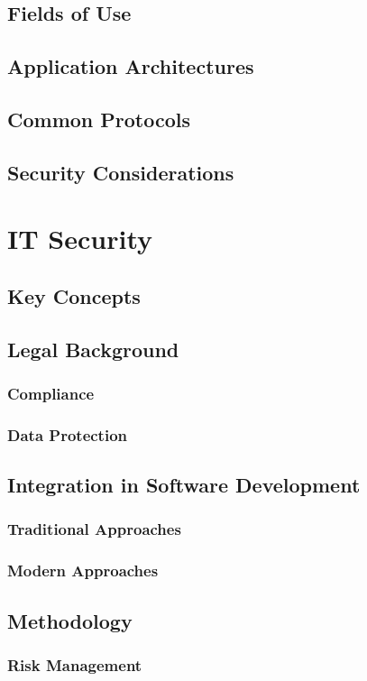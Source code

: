 \subsection{Fields of Use}
\subsection{Application Architectures}
\subsection{Common Protocols}
\subsection{Security Considerations}

\section{IT Security}
\subsection{Key Concepts} %
\subsection{Legal Background} %
\subsubsection{Compliance}
\subsubsection{Data Protection}
\subsection{Integration in Software Development}
\subsubsection{Traditional Approaches}
\subsubsection{Modern Approaches}
\subsection{Methodology}
\subsubsection{Risk Management}
